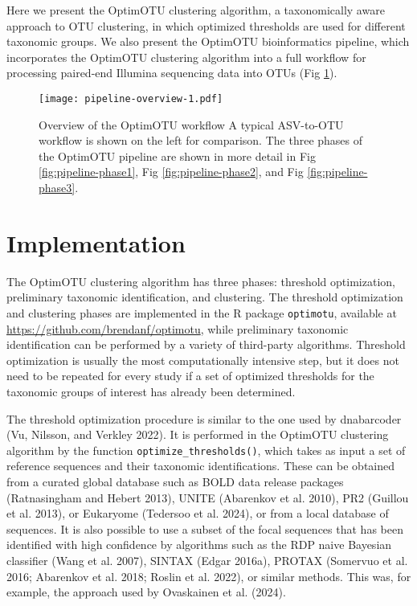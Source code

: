 \documentclass[
]{article}
\begin{document}
Here we present the OptimOTU clustering algorithm, a taxonomically aware approach to OTU clustering, in which optimized thresholds are used for different taxonomic groups.
We also present the OptimOTU bioinformatics pipeline, which incorporates the OptimOTU clustering algorithm into a full workflow for processing paired-end Illumina sequencing data into OTUs (Fig \ref{fig:pipeline-overview}).





\begin{figure}
\centering
\texttt{[image: pipeline-overview-1.pdf]}
\caption{\label{fig:pipeline-overview}Overview of the OptimOTU workflow
A typical ASV-to-OTU workflow is shown on the left for comparison.
The three phases of the OptimOTU pipeline are shown in more detail in Fig \ref{fig:pipeline-phase1}, Fig \ref{fig:pipeline-phase2}, and Fig \ref{fig:pipeline-phase3}.}
\end{figure}

\section{Implementation}\label{implementation}

The OptimOTU clustering algorithm has three phases: threshold optimization, preliminary taxonomic identification, and clustering.
The threshold optimization and clustering phases are implemented in the R package \texttt{optimotu}, available at \url{https://github.com/brendanf/optimotu}, while preliminary taxonomic identification can be performed by a variety of third-party algorithms.
Threshold optimization is usually the most computationally intensive step, but it does not need to be repeated for every study if a set of optimized thresholds for the taxonomic groups of interest has already been determined.

The threshold optimization procedure is similar to the one used by dnabarcoder (Vu, Nilsson, and Verkley 2022).
It is performed in the OptimOTU clustering algorithm by the function \texttt{optimize\_thresholds()}, which takes as input a set of reference sequences and their taxonomic identifications.
These can be obtained from a curated global database such as BOLD data release packages (Ratnasingham and Hebert 2013), UNITE (Abarenkov et al. 2010), PR2 (Guillou et al. 2013), or Eukaryome (Tedersoo et al. 2024), or from a local database of sequences.
It is also possible to use a subset of the focal sequences that has been identified with high confidence by algorithms such as the RDP naive Bayesian classifier (Wang et al. 2007), SINTAX (Edgar 2016a), PROTAX (Somervuo et al. 2016; Abarenkov et al. 2018; Roslin et al. 2022), or similar methods.
This was, for example, the approach used by Ovaskainen et al. (2024).
\end{document}

